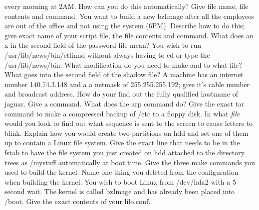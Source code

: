 every morning at 2AM.
How can you do this automatically? Give file name, file contents and command.
\vskip 1.4in
You want to build a new {\ltt{}bzImage} after all the employees are out
of the office and not using the system (6PM).
Describe how to do this; give exact name of your script file, the file contents
and command.
\vskip 1.6in
\ques
What does an {\ltt{}x} in the second field of the password file mean?
\vskip 0.4in
You wish to run {\ltt{}/usr/lib/news/bin/ctlinnd} without always
having to {\ltt{}cd} or type the {\ltt{}/usr/lib/news/bin}.
What modification do you need to make and to what file?
\vskip 0.8in
What goes into the second field of the {\ltt{}shadow} file?
\vskip 0.4in
\ques
A machine has an internet number {\ltt{}140.74.3.148}
and a a netmask of {\ltt{}255.255.255.192};
give it's cable number and broadcast address.
\vskip 0.8in
How do your find out the fully qualified hostname of {\ltt{}jaguar}.
Give a command.
\vskip 0.4in
What does the {\ltt{}arp} command do?
\vskip 0.8in
\vfill\eject
\ques
Give the exact tar command to make a compressed backup of {\ltt{}/etc}
to a floppy disk.
\vskip 0.4in
In what {\it file} would you look to find out what sequence is sent to the
screen to cause letters to blink. 
\vskip 0.4in
\ques
Explain how you would create two partitions on {\ltt{}hdd} and
set one of them up to contain a Linux file system.
\vskip 1.6in
Give the exact line that needs to be in the {\ltt{}fstab} to
have the file system you just created on {\ltt{}hdd} attached to the directory
trees as {\ltt{}/mystuff} automatically at boot time.
\vskip 0.5in
\ques
Give the three {\ltt{}make} commands you used to build the kernel.
\vskip 1.5in
Name one thing you deleted from the configuration when building the kernel.
\vskip 0.5in
You wish to boot Linux from {\ltt{}/dev/hda2} with a 5 second wait.
The kernel is called {\ltt{}bzImage} and has already been placed into
{\ltt{}/boot}.
Give the exact contents of your {\ltt{}lilo.conf}.
\vskip 1.8in
\bye
